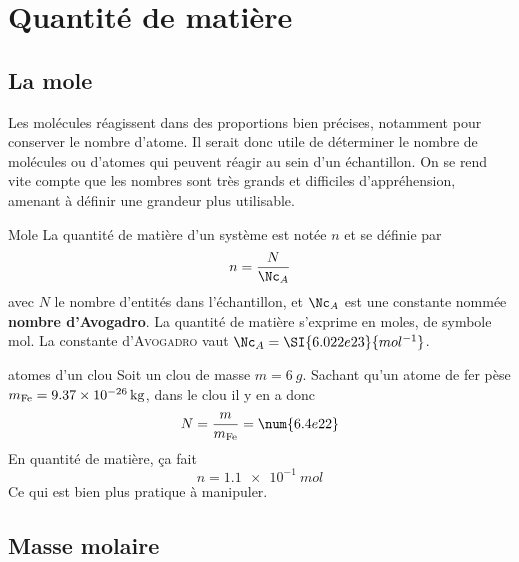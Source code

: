\documentclass[../main/main.tex]{subfiles}
\begin{document}
\section{Quantité de matière}
\subsection{La mole}

Les molécules réagissent dans des proportions bien précises, notamment pour
conserver le nombre d'atome. Il serait donc utile de déterminer le nombre de
molécules ou d'atomes qui peuvent réagir au sein d'un échantillon. On se rend
vite compte que les nombres sont très grands et difficiles d'appréhension,
amenant à définir une grandeur plus utilisable.

\begin{tcbraster}[raster columns=2, raster equal height=rows]
    \begin{defi}[label=def:mole]{Mole}
        La quantité de matière d'un système est notée $n$ et se définie par
        \[ n = \frac{N}{\Nc_A}\]
        avec $N$ le nombre d'entités dans l'échantillon, et $\Nc_A$ est une
        constante nommée \textbf{nombre d'Avogadro}.
        La quantité de matière s'exprime en moles, de symbole mol. La constante
        d'\textsc{Avogadro} vaut $\Nc_A = \SI{6.022e23}{mol^{-1}}$.
    \end{defi}
    \begin{exem}[label=exem:nbat]{atomes d'un clou}
        Soit un clou de masse $m = \SI{6}{g}$. Sachant qu'un atome de fer pèse
        $m_{\rm Fe} = \SI{9.37e-26}{kg}$, dans le clou il y en a donc
        \[N = \frac{m}{m_{\rm Fe}} = \num{6.4e22}\]
        En quantité de matière, ça fait
        \[ n = \SI{1.1e-1}{mol}\]
        Ce qui est bien plus pratique à manipuler.
    \end{exem}
\end{tcbraster}

\subsection{Masse molaire}
\end{document}
